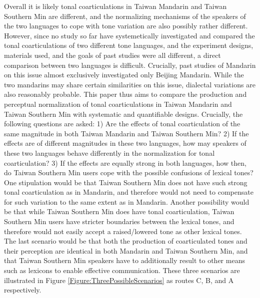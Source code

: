 \documentclass[12pt]{report}
\begin{document}
\begin{CJK}{UTF8}{bsmi}
Overall it is likely tonal coarticulations in Taiwan Mandarin and Taiwan Southern Min are different, and the normalizing mechanisms of the speakers of the two languages to cope with tone variation are also possibly rather different. However, since no study so far have systemetically investigated and compared the tonal coarticulations of two different tone languages, and the experiment designs, materials used, and the goals of past studies were all different, a direct comparison between two languages is difficult. Crucially, past studies of Mandarin on this issue almost exclusively investigated only Beijing Mandarin. While the two mandarins may share certain similarities on this issue, dialectal variations are also reasonably probable. This paper thus aims to compare the production and perceptual normalization of tonal coarticulations in Taiwan Mandarin and Taiwan Southern Min with systematic and quantifiable designs. Crucially, the following questions are asked: 1) Are the effects of tonal coarticulation of the same magnitude in both Taiwan Mandarin and Taiwan Southern Min? 2) If the effects are of different magnitudes in these two languages, how may speakers of these two languages behave differently in the normalization for tonal coarticulation? 3) If the effects are equally strong in both languages, how then, do Taiwan Southern Min users cope with the possible confusions of lexical tones? One stipulation would be that Taiwan Southern Min does not have such strong tonal coarticulation as in Mandarin, and therefore would not need to compensate for such variation to the same extent as in Mandarin. Another possibility would be that while Taiwan Southern Min does have tonal coarticulation, Taiwan Southern Min users have stricter boundaries between the lexical tones, and therefore would not easily accept a raised/lowered tone as other lexical tones. The last scenario would be that both the production of coarticulated tones and their perception are identical in both Mandarin and Taiwan Southern Min, and that Taiwan Southern Min speakers have to additionally result to other means such as lexicons to enable effective communication. These three scenarios are illustrated in Figure \ref{Figure:ThreePossibleScenarios} as routes C, B, and A respectively.
\begin{figure}[hbt!]
\centering
{}
\end{figure}
\end{CJK}
\end{document}
